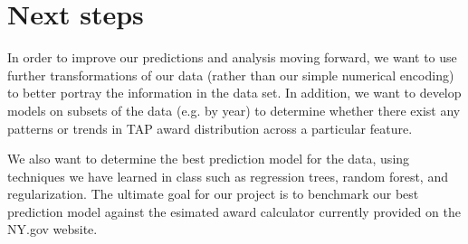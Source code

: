 \documentclass[11pt, fleqn]{article}
\begin{document}
\section{Next steps}
In order to improve our predictions and analysis moving forward, we want to use further transformations of our data (rather than our simple numerical encoding) to better portray the information in the data set. In addition, we want to develop models on subsets of the data (e.g. by year) to determine whether there exist any patterns or trends in TAP award distribution across a particular feature.

We also want to determine the best prediction model for the data, using techniques we have learned in class such as regression trees, random forest, and regularization. The ultimate goal for our project is to benchmark our best prediction model against the esimated award calculator currently provided on the NY.gov website.
\end{document}
